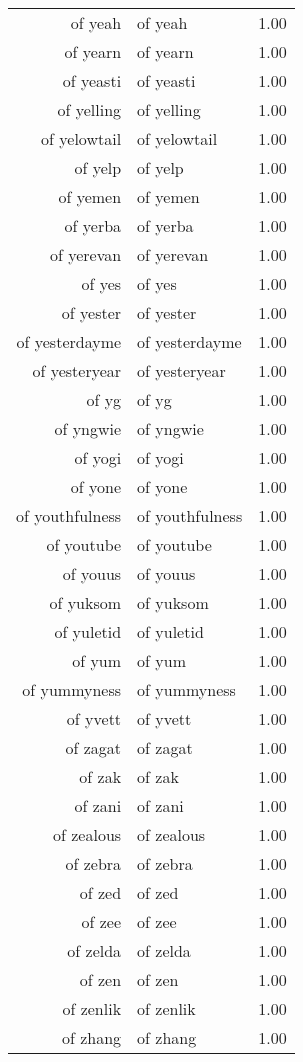 \begin{table}[ht]
\begin{tabular}{rlr}
  of yeah & of yeah & 1.00 \\ 
  of yearn & of yearn & 1.00 \\ 
  of yeasti & of yeasti & 1.00 \\ 
  of yelling & of yelling & 1.00 \\ 
  of yelowtail & of yelowtail & 1.00 \\ 
  of yelp & of yelp & 1.00 \\ 
  of yemen & of yemen & 1.00 \\ 
  of yerba & of yerba & 1.00 \\ 
  of yerevan & of yerevan & 1.00 \\ 
  of yes & of yes & 1.00 \\ 
  of yester & of yester & 1.00 \\ 
  of yesterdayme & of yesterdayme & 1.00 \\ 
  of yesteryear & of yesteryear & 1.00 \\ 
  of yg & of yg & 1.00 \\ 
  of yngwie & of yngwie & 1.00 \\ 
  of yogi & of yogi & 1.00 \\ 
  of yone & of yone & 1.00 \\ 
  of youthfulness & of youthfulness & 1.00 \\ 
  of youtube & of youtube & 1.00 \\ 
  of youus & of youus & 1.00 \\ 
  of yuksom & of yuksom & 1.00 \\ 
  of yuletid & of yuletid & 1.00 \\ 
  of yum & of yum & 1.00 \\ 
  of yummyness & of yummyness & 1.00 \\ 
  of yvett & of yvett & 1.00 \\ 
  of zagat & of zagat & 1.00 \\ 
  of zak & of zak & 1.00 \\ 
  of zani & of zani & 1.00 \\ 
  of zealous & of zealous & 1.00 \\ 
  of zebra & of zebra & 1.00 \\ 
  of zed & of zed & 1.00 \\ 
  of zee & of zee & 1.00 \\ 
  of zelda & of zelda & 1.00 \\ 
  of zen & of zen & 1.00 \\ 
  of zenlik & of zenlik & 1.00 \\ 
  of zhang & of zhang & 1.00 \\ 

\end{tabular}
\end{table}
